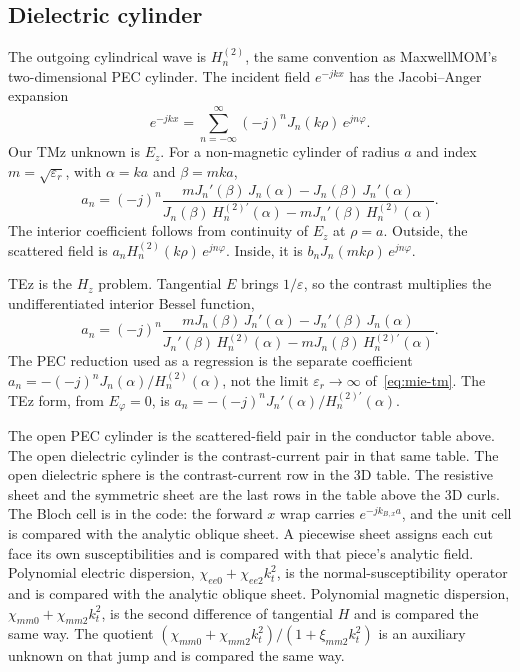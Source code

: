 \documentclass[11pt,a4paper]{article}
\numberwithin{equation}{section}
\begin{document}
\subsection{Dielectric cylinder}
\label{sec:mie2d}

The outgoing cylindrical wave is $H_n^{(2)}$, the same convention as
MaxwellMOM's two-dimensional PEC cylinder. The incident field
$e^{-jkx}$ has the Jacobi--Anger expansion
\begin{equation}
e^{-jkx} = \sum_{n=-\infty}^{\infty} (-j)^n J_n(k\rho)\, e^{jn\varphi}.
\label{eq:mie-inc}
\end{equation}
Our TMz unknown is $E_z$. For a non-magnetic cylinder of radius $a$ and
index $m=\sqrt{\varepsilon_r}$, with $\alpha=ka$ and $\beta=mka$,
\begin{equation}
a_n = (-j)^n
\frac{m J_n'(\beta)\, J_n(\alpha) - J_n(\beta)\, J_n'(\alpha)}
{J_n(\beta)\, H_n^{(2)\prime}(\alpha) - m J_n'(\beta)\, H_n^{(2)}(\alpha)}.
\label{eq:mie-tm}
\end{equation}
The interior coefficient follows from continuity of $E_z$ at $\rho=a$.
Outside, the scattered field is $a_n H_n^{(2)}(k\rho)\, e^{jn\varphi}$.
Inside, it is $b_n J_n(mk\rho)\, e^{jn\varphi}$.

TEz is the $H_z$ problem. Tangential $E$ brings $1/\varepsilon$, so the
contrast multiplies the undifferentiated interior Bessel function,
\begin{equation}
a_n = (-j)^n
\frac{m J_n(\beta)\, J_n'(\alpha) - J_n'(\beta)\, J_n(\alpha)}
{J_n'(\beta)\, H_n^{(2)}(\alpha) - m J_n(\beta)\, H_n^{(2)\prime}(\alpha)}.
\label{eq:mie-te}
\end{equation}
The PEC reduction used as a regression is the separate coefficient
$a_n=-(-j)^n J_n(\alpha)/H_n^{(2)}(\alpha)$, not the limit
$\varepsilon_r\to\infty$ of~\eqref{eq:mie-tm}. The TEz form, from
$E_\varphi=0$, is
$a_n=-(-j)^n J_n'(\alpha)/H_n^{(2)\prime}(\alpha)$.

The open PEC cylinder is the scattered-field pair in the conductor table
above. The open dielectric cylinder is the contrast-current pair in that
same table. The open dielectric sphere is the contrast-current row in the
3D table. The resistive sheet and the symmetric sheet are the last rows
in the table above the 3D curls. The Bloch cell is in the code: the
forward $x$ wrap carries $e^{-j k_{B,x} a}$, and the unit cell is
compared with the analytic oblique sheet. A piecewise sheet assigns
each cut face its own susceptibilities and is compared with that
piece's analytic field. Polynomial electric dispersion,
$\chi_{ee0}+\chi_{ee2}k_t^2$, is the normal-susceptibility operator and
is compared with the analytic oblique sheet. Polynomial magnetic
dispersion, $\chi_{mm0}+\chi_{mm2}k_t^2$, is the second difference of
tangential $H$ and is compared the same way. The quotient
$(\chi_{mm0}+\chi_{mm2}k_t^2)/(1+\xi_{mm2}k_t^2)$ is an auxiliary
unknown on that jump and is compared the same way.
\end{document}
